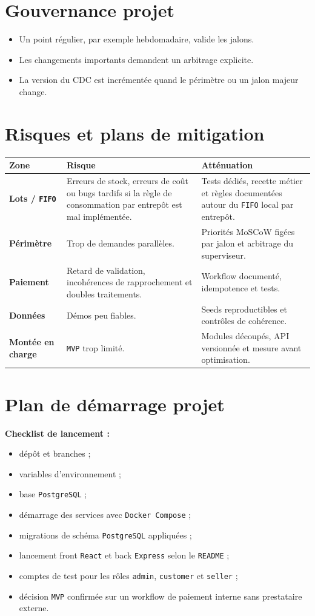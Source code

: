 \documentclass[11pt,a4paper]{scrreprt}
\newcommand{\code}[1]{\texttt{#1}}
\begin{document}
\section{Gouvernance projet}
\begin{itemize}
  \item Un point régulier, par exemple hebdomadaire, valide les jalons.
  \item Les changements importants demandent un arbitrage explicite.
  \item La version du CDC est incrémentée quand le périmètre ou un jalon majeur change.
\end{itemize}

\section{Risques et plans de mitigation}
\begin{vigilancebox}
\begin{tabularx}{\textwidth}{>{\bfseries}p{2.6cm}X X}
\toprule
Zone & Risque & Atténuation \\
\midrule
Lots / \code{FIFO} & Erreurs de stock, erreurs de coût ou bugs tardifs si la règle de consommation par entrepôt est mal implémentée. & Tests dédiés, recette métier et règles documentées autour du \code{FIFO} local par entrepôt. \\
Périmètre & Trop de demandes parallèles. & Priorités MoSCoW figées par jalon et arbitrage du superviseur. \\
Paiement & Retard de validation, incohérences de rapprochement et doubles traitements. & Workflow documenté, idempotence et tests. \\
Données & Démos peu fiables. & Seeds reproductibles et contrôles de cohérence. \\
Montée en charge & \code{MVP} trop limité. & Modules découpés, API versionnée et mesure avant optimisation. \\
\bottomrule
\end{tabularx}
\end{vigilancebox}

\section{Plan de démarrage projet}
\textbf{Checklist de lancement :}
\begin{itemize}
  \item dépôt et branches ;
  \item variables d'environnement ;
  \item base \code{PostgreSQL} ;
  \item démarrage des services avec \code{Docker Compose} ;
  \item migrations de schéma \code{PostgreSQL} appliquées ;
  \item lancement front \code{React} et back \code{Express} selon le \code{README} ;
  \item comptes de test pour les rôles \code{admin}, \code{customer} et \code{seller} ;
  \item décision \code{MVP} confirmée sur un workflow de paiement interne sans prestataire externe.
\end{itemize}
\end{document}
